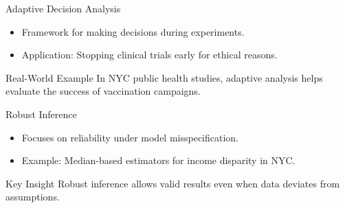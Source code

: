 \documentclass{beamer}
\begin{document}
\begin{frame}{Adaptive Decision Analysis}
\begin{itemize}
    \item Framework for making decisions during experiments.
    \item Application: Stopping clinical trials early for ethical reasons.
\end{itemize}

\begin{block}{Real-World Example}
In NYC public health studies, adaptive analysis helps evaluate the success of vaccination campaigns.
\end{block}
\end{frame}

\begin{frame}{Robust Inference}
\begin{itemize}
    \item Focuses on reliability under model misspecification.
    \item Example: Median-based estimators for income disparity in NYC.
\end{itemize}

\begin{block}{Key Insight}
Robust inference allows valid results even when data deviates from assumptions.
\end{block}
\end{frame}
\end{document}
